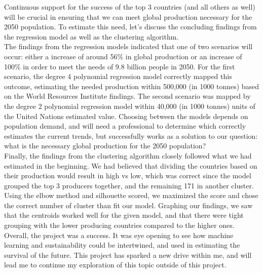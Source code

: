 \documentclass[12pt, a4paper]{article}
\begin{document}
\begin{spacing}{1.1}

	\noindent Continuous support for the success of the top 3 countries (and all others as well) will be crucial in ensuring that we can meet global production necessary for the 2050 population. To estimate this need, let's discuss the concluding findings from the regression model as well as the clustering algorithm. \vspace*{2mm}\\
	The findings from the regression models indicated that one of two scenarios will occur: either a increase of around 56\% in global production or an increase of 100\% in order to meet the needs of 9.8 billion people in 2050. For the first scenario, the degree 4 polynomial regression model correctly mapped this outcome, estimating the needed production within 500,000 (in 1000 tonnes) based on the World Resources Institute findings. The second scenario was mapped by the degree 2 polynomial regression model within 40,000 (in 1000 tonnes) units of the United Nations estimated value. Choosing between the models depends on population demand, and will need a professional to determine which correctly estimates the current trends, but successfully works as a solution to our question: what is the necessary global production for the 2050 population? \vspace*{2mm}\\
	Finally, the findings from the clustering algorithm closely followed what we had estimated in the beginning. We had believed that dividing the countries based on their production would result in high vs low, which was correct since the model grouped the top 3 producers together, and the remaining 171 in another cluster. Using the elbow method and silhouette scored, we maximized the score and chose the correct number of cluster than fit our model. Graphing our findings, we saw that the centroids worked well for the given model, and that there were tight grouping with the lower producing countries compared to the higher ones.\vspace*{2mm}\\
	Overall, the project was a success. It was eye opening to see how machine learning and sustainability could be intertwined, and used in estimating the survival of the future. This project has sparked a new drive within me, and will lead me to continue my exploration of this topic outside of this project. 

	






\end{spacing}
\end{document}
